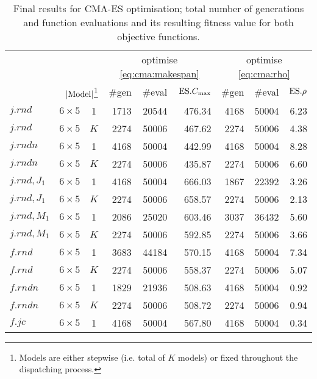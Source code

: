 \begin{table}[t!]\centering 
\caption[Final results for CMA-ES optimisation]{Final results for CMA-ES 
    optimisation; total number of generations and function evaluations and its 
    resulting fitness value for both objective functions.}\label{tbl:cma:run}
\vspace{-3pt} \noindent %
\begin{minipage}{\textwidth}\centering
\begin{tabular}{llcrrrrrr}
    \toprule
    & & & \multicolumn{3}{c}{optimise \cref{eq:cma:makespan}} & 
    \multicolumn{3}{c}{optimise \cref{eq:cma:rho}} \\
    \multicolumn{3}{r}{\ProblemSpace{\train} \quad 
    $\lvert\text{Model}\rvert$\footnote{Models are either stepwise (i.e. 
        total of $K$ models) or fixed throughout the dispatching 
        process.}} &
        \#gen & \#eval & $\text{ES}.{C_{\max}}$ & \#gen & \#eval & $\text{ES}.{\rho}$ \\ 
    \midrule
    $j.rnd$ & $6\times5$ & 1 & 1713 & 20544 & 476.34 & 4168 & 50004 & 6.23 \\ 
    $j.rnd$ & $6\times5$ & $K$ & 2274 & 50006 & 467.62 & 2274 & 50006 & 4.38 \\ 
    $j.rndn$ & $6\times5$ & 1 & 4168 & 50004 & 442.99 & 4168 & 50004 & 8.28 \\ 
    $j.rndn$ & $6\times5$ & $K$ & 2274 & 50006 & 435.87 & 2274 & 50006 & 6.60 
    \\ 
    $j.rnd,J_1$ & $6\times5$ & 1 & 4168 & 50004 & 666.03 & 1867 & 22392 & 3.26 
    \\ 
    $j.rnd,J_1$ & $6\times5$ & $K$ & 2274 & 50006 & 658.57 & 2274 & 50006 & 
    2.13 \\ 
    $j.rnd,M_1$ & $6\times5$ & 1 & 2086 & 25020 & 603.46 & 3037 & 36432 & 5.60 
    \\ 
    $j.rnd,M_1$ & $6\times5$ & $K$ & 2274 & 50006 & 592.85 & 2274 & 50006 & 
    3.66 \\ 
    $f.rnd$ & $6\times5$ & 1 & 3683 & 44184 & 570.15 & 4168 & 50004 & 7.34 \\ 
    $f.rnd$ & $6\times5$ & $K$ & 2274 & 50006 & 558.37 & 2274 & 50006 & 5.07 \\ 
    $f.rndn$ & $6\times5$ & 1 & 1829 & 21936 & 508.63 & 4168 & 50004 & 0.92 \\ 
    $f.rndn$ & $6\times5$ & $K$ & 2274 & 50006 & 508.72 & 2274 & 50006 & 0.94 
    \\ 
    $f.jc$ & $6\times5$ & 1 & 4168 & 50004 & 567.80 & 4168 & 50004 & 0.34 \\ 

\end{tabular}
\end{minipage}
\end{table}
